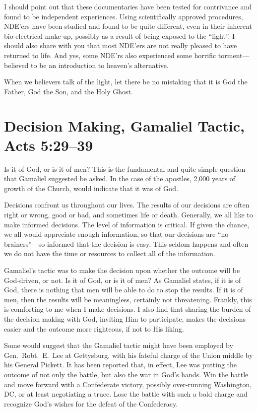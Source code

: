 \documentclass[12pt]{memoir}
\begin{document}
I should point out that these documentaries have
been tested for contrivance and found to be independent experiences.
Using scientifically approved procedures, NDE'ers have been studied and found to be quite different, even in their inherent bio-electrical make-up, possibly as a result of being exposed to the ``light''.
I should also share with you that most NDE'ers are not really pleased
to have returned to life. And yes, some NDE'rs also experienced some
horrific torment---believed to be an introduction to heaven's alternative.

When we believers talk of the light, let there be no mistaking that it is God the Father, God the Son, and the Holy Ghost.

\section[Decision Making, Gamaliel Tactic]{Decision Making, Gamaliel Tactic, Acts 5:29--39}

Is it of God, or is it of men? This is the fundamental and quite simple question that Gamaliel suggested be asked. In the case of the apostles, 2,000 years of growth of the Church, would indicate that it was of God.

Decisions confront us throughout our lives. The results of our decisions
are often right or wrong, good or bad, and sometimes life or death.
Generally, we all like to make informed decisions. The level
of information is critical. If given the chance, we all would appreciate
enough information, so that our decisions are ``no brainers''---so
informed that the decision is easy. This seldom happens and often
we do not have the time or resources to collect all of the information.

Gamaliel's tactic was to make the decision upon whether the outcome
will be God-driven, or not. Is it of God, or is it of men? As Gamaliel states, if it is of God, there is nothing that men will be able to
do to stop the results. If it is of men, then the results will be
meaningless, certainly not threatening. Frankly, this is comforting
to me when I make decisions. I also find that sharing the burden of
the decision making with God, inviting Him to participate, makes the decisions easier and the outcome more righteous, if not to His
liking.

Some would suggest that the Gamaliel tactic might have been employed
by Gen.\ Robt.~E.~Lee at Gettysburg, with his fateful charge of the
Union middle by his General Pickett. It has been reported that, in effect, Lee was putting the outcome of not only the battle, but also the war in God's hands. Win the battle and move forward with a Confederate
victory, possibly over-running Washington, DC, or at least negotiating
a truce. Lose the battle with such a bold charge and recognize God's wishes for the defeat of the Confederacy.
\end{document}
